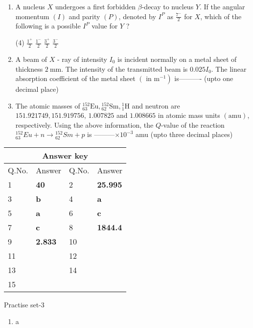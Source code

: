 \begin{enumerate}
\begin{tasks}
		\task[\textbf{c.}]Not allowed by Fermi but allowed by Gamow-Teller selection rule
		\task[\textbf{d.}] Not allowed both by Fermi and Gamow-Teller selection rule
	\end{tasks}
\item  A nucleus $X$ undergoes a first forbidden $\beta$-decay to nucleus $Y$. If the angular momentum $(I)$ and parity $(P)$, denoted by $I^P$ as $\frac{7^{-}}{2}$ for $X$, which of the following is a possible $I^P$ value for $Y$ ?
{}
	 \begin{tasks}(4)
		\task[\textbf{a.}]$\frac{1^{+}}{2}$
		\task[\textbf{b.}]$\frac{1^{-}}{2}$
		\task[\textbf{c.}]$\frac{3^{+}}{2}$
		\task[\textbf{d.}]$\frac{3^{-}}{2}$ 
	\end{tasks}
	\item A beam of $X$ - ray of intensity $I_0$ is incident normally on a metal sheet of thickness $2 \mathrm{~mm}$. The intensity of the transmitted beam is $0.025 I_0$. The linear absorption coefficient of the metal sheet $\left(\right.$ in $\left.\mathrm{m}^{-1}\right)$ is---------- (upto one decimal place)
	{}
	\item The atomic masses of ${ }_{63}^{152} \mathrm{Eu},{ }_{62}^{152} \mathrm{Sm},{ }_1^1 \mathrm{H}$ and neutron are $151.921749,151.919756$, $1.007825$ and $1.008665$ in atomic mass units $(\mathrm{amu})$, respectively. Using the above information, the $Q$-value of the reaction ${ }_{63}^{152} E u+n \rightarrow{ }_{62}^{152} S m+p$ is ---------$\times 10^{-3}$ amu (upto three decimal places)
	{}
\end{enumerate}
\setlength\arrayrulewidth{1pt}
\begin{table}[H]
	\centering
	\begin{tabular}{|p{1.5cm}|p{1.5cm}||p{1.5cm}|p{1.5cm}|}
		\hline
		\multicolumn{4}{|c|}{\textbf{Answer key}}\\\hline\hline
		\rowcolor{ocrel}Q.No.&Answer&Q.No.&Answer\\\hline
		1&\textbf{40} &2&\textbf{25.995}\\\hline 
		3&\textbf{b} &4&\textbf{a} \\\hline
		5&\textbf{a} &6&\textbf{c} \\\hline
		7&\textbf{c}&8&\textbf{1844.4}\\\hline
		9&\textbf{2.833}&10&\textbf{}\\\hline
		11&\textbf{} &12&\textbf{}\\\hline
		13&\textbf{}&14&\textbf{}\\\hline
		15&\textbf{}& &\\\hline
	
	\end{tabular}
\end{table}

\newpage
\begin{abox}
	Practise set-3
	\end{abox}
\begin{enumerate}
	\item a
	
	
	
	
	
\end{enumerate}







